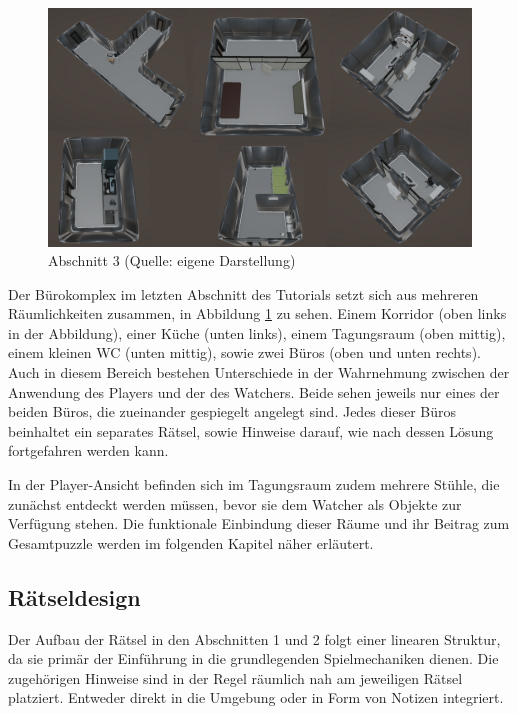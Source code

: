 \begin{figure}[ht]
\centering
\includegraphics[width=1\linewidth]{content/pictures/Abschnitt_02.png}
\caption{Abschnitt 3 (Quelle: eigene Darstellung)}
\label{fig:section_02}
\end{figure}

Der Bürokomplex im letzten Abschnitt des Tutorials setzt sich aus mehreren Räumlichkeiten zusammen, in Abbildung \ref{fig:section_02} zu sehen. Einem Korridor (oben links in der Abbildung), einer Küche (unten links), einem Tagungsraum (oben mittig), einem kleinen WC (unten mittig), sowie zwei Büros (oben und unten rechts). Auch in diesem Bereich bestehen Unterschiede in der Wahrnehmung zwischen der Anwendung des Players und der des Watchers. Beide sehen jeweils nur eines der beiden Büros, die zueinander gespiegelt angelegt sind. Jedes dieser Büros beinhaltet ein separates Rätsel, sowie Hinweise darauf, wie nach dessen Lösung fortgefahren werden kann.

In der Player-Ansicht befinden sich im Tagungsraum zudem mehrere Stühle, die zunächst entdeckt werden müssen, bevor sie dem Watcher als Objekte zur Verfügung stehen. Die funktionale Einbindung dieser Räume und ihr Beitrag zum Gesamtpuzzle werden im folgenden Kapitel \emph{} näher erläutert.

\subsection{Rätseldesign}\label{sec:riddles}

Der Aufbau der Rätsel in den Abschnitten 1 und 2 folgt einer linearen Struktur, da sie primär der Einführung in die grundlegenden Spielmechaniken dienen. Die zugehörigen Hinweise sind in der Regel räumlich nah am jeweiligen Rätsel platziert. Entweder direkt in die Umgebung oder in Form von Notizen integriert.

